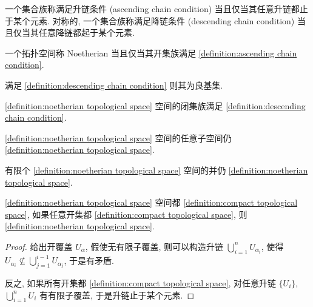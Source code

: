 \begin{definition}[升链条件]
    \label {definition:ascending chain condition}
    一个集合族称满足升链条件 (ascending chain condition) 当且仅当其任意升链都止于某个元素.
    \label {definition:descending chain condition}
    对称的, 一个集合族称满足降链条件 (descending chain condition) 当且仅当其任意降链都起于某个元素.
\end{definition}

\begin{definition}[Noetherian]
    \label {definition:noetherian topological space}
    一个拓扑空间称 Noetherian 当且仅当其开集族满足 \ref{definition:ascending chain condition}.
\end{definition}

\begin{lemma}
    满足 \ref{definition:descending chain condition} 则其为良基集.
\end{lemma}

\begin{corollary}
    \ref{definition:noetherian topological space} 空间的闭集族满足 \ref{definition:descending chain condition}.
\end{corollary}

\begin{lemma}
    \ref{definition:noetherian topological space} 空间的任意子空间仍 \ref{definition:noetherian topological space}. 
\end{lemma}

\begin{lemma}
    有限个 \ref{definition:noetherian topological space} 空间的并仍 \ref{definition:noetherian topological space}.
\end{lemma}

\begin{lemma}
    \ref{definition:noetherian topological space} 空间都 \ref{definition:compact topological space},
    如果任意开集都 \ref{definition:compact topological space}, 则 \ref{definition:noetherian topological space}.

    \begin{proof}
        给出开覆盖 \(U_\alpha\), 假使无有限子覆盖, 则可以构造升链 \(\bigcup_{i = 1}^n U_{\alpha_i}\), 
        使得 \(U_{\alpha_i} \nsubseteq \bigcup_{j = 1}^{i-1} U_{\alpha_j}\), 于是有矛盾.

        反之, 如果所有开集都 \ref{definition:compact topological space}, 对任意升链 \(\{U_i\}\), 
        \(\bigcup_{i = 1}^n U_i\) 有有限子覆盖, 于是升链止于某个元素.
    \end{proof}
\end{lemma}

